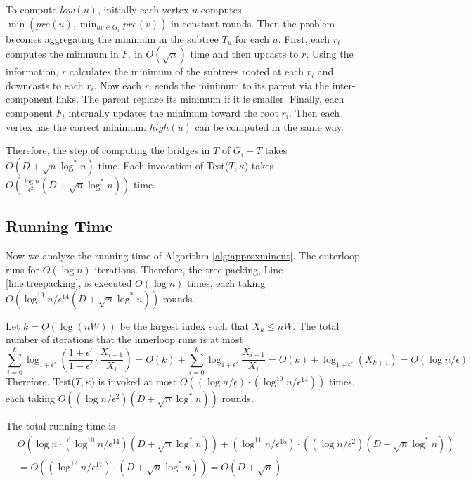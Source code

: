 \documentclass[11pt]{article}
\begin{document}
To compute $\mathit{low}(u)$, initially each vertex $u$ computes $\min(\mathit{pre}(u),\min_{uv \in G_i}\mathit{pre}(v))$ in constant rounds. Then the problem becomes aggregating the minimum in the subtree $T_u$ for each $u$. First, each $r_i$ computes the minimum in $F_i$ in $O(\sqrt{n})$ time and then upcasts to $r$. Using the information, $r$ calculates the minimum of the subtrees rooted at each $r_i$ and downcasts to each $r_i$. Now each $r_i$ sends the minimum to its parent via the inter-component links. The parent replace its minimum if it is smaller. Finally, each component $F_i$ internally updates the minimum toward the root $r_i$. Then each vertex has the correct minimum. $\mathit{high}(u)$ can be computed in the same way.

Therefore, the step of computing the bridges in $T$ of $G_i + T$ takes $O(D + \sqrt{n} \log^{*} n)$ time. Each invocation of Test($T,\kappa$) takes $O(\frac{\log n}{\epsilon^2}(D+\sqrt{n} \log^{*} n))$ time. 

\subsection{Running Time}
Now we analyze the running time of Algorithm \ref{alg:approxmincut}. The outerloop runs for $O(\log n)$ iterations. Therefore, the tree packing, Line \ref{line:treepacking}, is executed $O(\log n)$ times, each taking $O(\log^{10} n / \epsilon^{14}(D + \sqrt{n}\log^{*} n))$ rounds.

Let $k = O(\log (nW))$ be the largest index such that $X_k \leq nW$. The total number of iterations that the innerloop runs is at most $$\sum_{i=0}^{k} \log_{1+\epsilon'} \left(\frac{1+\epsilon'}{1-\epsilon'} \cdot \frac{X_{i+1}}{X_{i}}\right)
= O(k) + \sum_{i=0}^{k} \log_{1+\epsilon'}\frac{X_{i+1}}{X_i} = O(k) + \log_{1+\epsilon'} (X_{k+1}) = O(\log n/ \epsilon)$$
Therefore, Test($T,\kappa$) is invoked at most $O( (\log n / \epsilon)\cdot (\log^{10} n / \epsilon^{14}) )$ times, each taking $O((\log n/ \epsilon^2)(D + \sqrt{n} \log^{*} n))$ rounds. 

The total running time is
\begin{align*}&O(\log n \cdot (\log^{10} n / \epsilon^{14})(D + \sqrt{n}\log^{*} n) ) + (\log^{11} n / \epsilon^{15})\cdot((\log n/ \epsilon^2)(D + \sqrt{n} \log^{*} n)) \\ &= O((\log^{12} n / \epsilon^{17}) \cdot (D + \sqrt{n}\log^{*} n) ) = \tilde{O}(D+\sqrt{n}) \end{align*}
\end{document}
